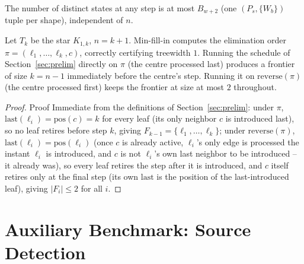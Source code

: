 \documentclass[ijoc,sglanonrev]{informs4}
\begin{document}
\begin{repeatproposition}
The number of distinct states at any step is at most $B_{w+2}$ (one
$(P_s,\{W_b\})$ tuple per shape), independent of $n$.
\end{repeatproposition}

\begin{repeatproposition}
Let $T_k$ be the star $K_{1,k}$, $n=k+1$. Min-fill-in computes the
elimination order $\pi=(\ell_1,\dots,\ell_k,c)$, correctly certifying
treewidth $1$. Running the schedule of Section~\ref{sec:prelim} directly on
$\pi$ (the centre processed last) produces a frontier of size $k=n-1$
immediately before the centre's step. Running it on $\mathrm{reverse}(\pi)$
(the centre processed first) keeps the frontier at size at most $2$
throughout.
\end{repeatproposition}
\begin{proof}{Proof}
Immediate from the definitions of Section~\ref{sec:prelim}: under $\pi$,
$\mathrm{last}(\ell_i)=\mathrm{pos}(c)=k$ for every leaf (its only neighbor
$c$ is introduced last), so no leaf retires before step $k$, giving
$F_{k-1}=\{\ell_1,\dots,\ell_k\}$; under $\mathrm{reverse}(\pi)$,
$\mathrm{last}(\ell_i)=\mathrm{pos}(\ell_i)$ (once $c$ is already active,
$\ell_i$'s only edge is processed the instant $\ell_i$ is introduced, and
$c$ is not $\ell_i$'s own last neighbor to be introduced -- it already was),
so every leaf retires the step after it is introduced, and $c$ itself
retires only at the final step (its own $\mathrm{last}$ is the position of
the last-introduced leaf), giving $|F_i|\le 2$ for all $i$.\Halmos
\end{proof}

\section{Auxiliary Benchmark: Source Detection}\label{ec:source-experiments}
\end{document}
